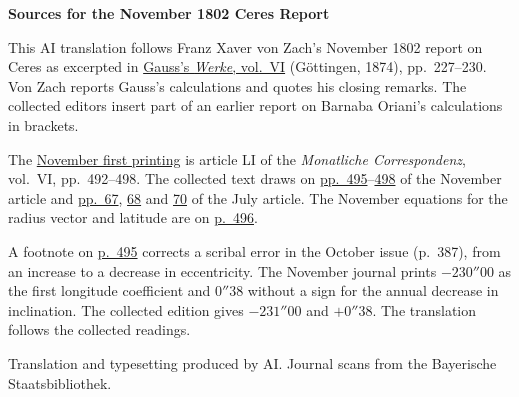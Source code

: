 \clearpage\thispagestyle{empty}
\begin{center}\textbf{Sources for the November 1802 Ceres Report}\end{center}
\noindent This AI translation follows Franz Xaver von Zach’s November 1802 report on Ceres as excerpted in \href{https://gdz.sub.uni-goettingen.de/id/PPN236007467}{Gauss’s \textit{Werke}, vol.~VI} (Göttingen, 1874), pp.~227--230. Von Zach reports Gauss’s calculations and quotes his closing remarks. The collected editors insert part of an earlier report on Barnaba Oriani’s calculations in brackets.
\par\smallskip\noindent The \href{https://api.digitale-sammlungen.de/iiif/image/v2/bsb10538598_00506/full/1450,/0/default.jpg}{November first printing} is article LI of the \textit{Monatliche Correspondenz}, vol.~VI, pp.~492--498. The collected text draws on \href{https://api.digitale-sammlungen.de/iiif/image/v2/bsb10538598_00509/full/1450,/0/default.jpg}{pp.~495}--\href{https://api.digitale-sammlungen.de/iiif/image/v2/bsb10538598_00512/full/1450,/0/default.jpg}{498} of the November article and \href{https://api.digitale-sammlungen.de/iiif/image/v2/bsb10538598_00073/full/1450,/0/default.jpg}{pp.~67}, \href{https://api.digitale-sammlungen.de/iiif/image/v2/bsb10538598_00074/full/1450,/0/default.jpg}{68} and \href{https://api.digitale-sammlungen.de/iiif/image/v2/bsb10538598_00076/full/1450,/0/default.jpg}{70} of the July article. The November equations for the radius vector and latitude are on \href{https://api.digitale-sammlungen.de/iiif/image/v2/bsb10538598_00510/full/1450,/0/default.jpg}{p.~496}.
\par\smallskip\noindent A footnote on \href{https://api.digitale-sammlungen.de/iiif/image/v2/bsb10538598_00509/full/1450,/0/default.jpg}{p.~495} corrects a scribal error in the October issue (p.~387), from an increase to a decrease in eccentricity. The November journal prints \(-230''00\) as the first longitude coefficient and \(0''38\) without a sign for the annual decrease in inclination. The collected edition gives \(-231''00\) and \(+0''38\). The translation follows the collected readings.
\par\smallskip\noindent Translation and typesetting produced by AI. Journal scans from the Bayerische Staatsbibliothek.
\clearpage
